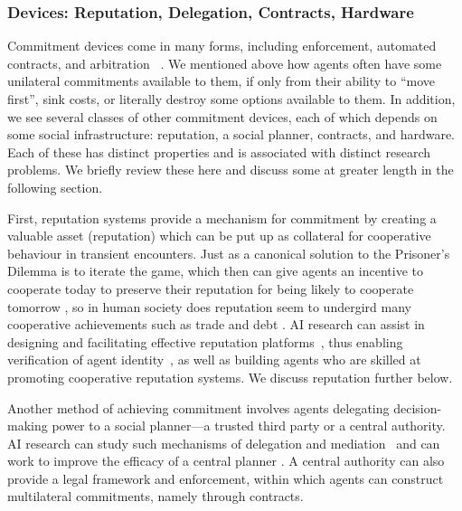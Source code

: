 \documentclass[11pt, a4paper, logo, onecolumn, nonumbering]{deepmind}
\begin{document}
\subsubsection{Devices: Reputation, Delegation, Contracts, Hardware}
\label{section:devices}
Commitment devices come in many forms, including enforcement, automated contracts, and arbitration
~\cite{boot1991credible,greif1994coordination,greif1994cultural,williams1997origins,ostrom1998behavioral,krasa2000optimal,rock2001securities,monderer2004k,mitusch2005mediation,monderer2009strong,kalai2010commitment,governatori2018legal,cong2019blockchain}. We mentioned above how agents often have some unilateral commitments available to them, if only from their ability to ``move first'', sink costs, or literally destroy some options available to them. In addition, we see several classes of other commitment devices, each of which depends on some social infrastructure: reputation, a social planner, contracts, and hardware. Each of these has distinct properties and is associated with distinct research problems. We briefly review these here and discuss some at greater length in the following section. 

First, reputation systems provide a mechanism for commitment by creating a valuable asset (reputation) which can be put up as collateral for cooperative behaviour in transient encounters. Just as a canonical solution to the Prisoner's Dilemma is to iterate the game, which then can give agents an incentive to cooperate today to preserve their reputation for being likely to cooperate tomorrow \cite{nowak1998evolution}, %
so in human society does reputation seem to undergird many cooperative achievements such as trade and debt \cite{greif1989reputation, tomz2012reputation}. AI research can assist in designing and facilitating effective reputation platforms~\cite{resnick2002trust,kornhauser1983reliance,zacharia2000trust}, thus enabling verification of agent identity~\cite{marti2003identity,gupta2003reputation}, as well as building agents who are skilled at promoting cooperative reputation systems. We discuss reputation further below. 

Another method of achieving commitment involves agents delegating decision-making power to a social planner---a trusted third party or a central authority. AI research can study such mechanisms of delegation and mediation~\cite{tennenholtz2004program,monderer2009strong} and can work to improve the efficacy of a central planner \cite{zheng2020ai}. A central authority can also provide a legal framework and enforcement, within which agents can construct multilateral commitments, namely through contracts. 
\end{document}
